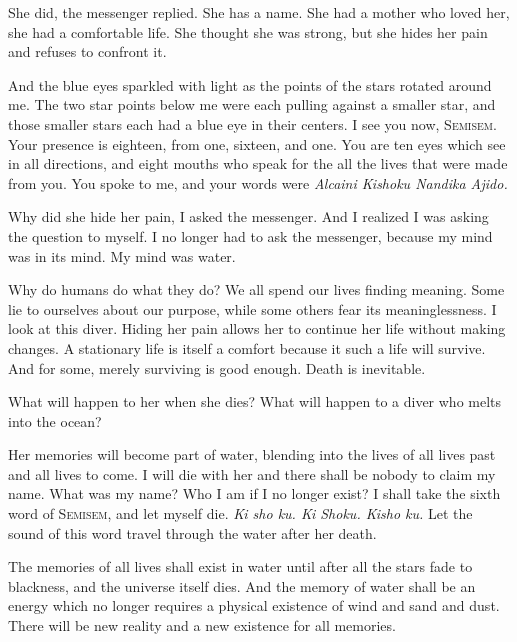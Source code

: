 \documentclass[12pt, letterpaper]{report}
\begin{document}
\vspace{1\baselineskip}
She did, the messenger replied. She has a name. She had a mother who loved her, she had a comfortable life. She thought she was strong, but she hides her pain and refuses to confront it.

\vspace{1\baselineskip}
And the blue eyes sparkled with light as the points of the stars rotated around me. The two star points below me were each pulling against a smaller star, and those smaller stars each had a blue eye in their centers. I see you now, S\textsc{emisem}. Your presence is eighteen, from one, sixteen, and one. You are ten eyes which see in all directions, and eight mouths who speak for the all the lives that were made from you. You spoke to me, and your words were \textit{Alcaini Kishoku Nandika Ajido.} 

\vspace{1\baselineskip}
Why did she hide her pain, I asked the messenger. And I realized I was asking the question to myself. I no longer had to ask the messenger, because my mind was in its mind. My mind was water.

\vspace{1\baselineskip}
Why do humans do what they do? We all spend our lives finding meaning. Some lie to ourselves about our purpose, while some others fear its meaninglessness. I look at this diver. Hiding her pain allows her to continue her life without making changes. A stationary life is itself a comfort because it such a life will survive. And for some, merely surviving is good enough. Death is inevitable.

\vspace{1\baselineskip}
What will happen to her when she dies? What will happen to a diver who melts into the ocean?

\vspace{1\baselineskip}
Her memories will become part of water, blending into the lives of all lives past and all lives to come. I will die with her and there shall be nobody to claim my name. What was my name? Who I am if I no longer exist? I shall take the sixth word of S\textsc{emisem}, and let myself die. \textit{Ki sho ku. Ki Shoku. Kisho ku.} Let the sound of this word travel through the water after her death.

\vspace{1\baselineskip}
The memories of all lives shall exist in water until after all the stars fade to blackness, and the universe itself dies. And the memory of water shall be an energy which no longer requires a physical existence of wind and sand and dust. There will be new reality and a new existence for all memories. 
\end{document}
